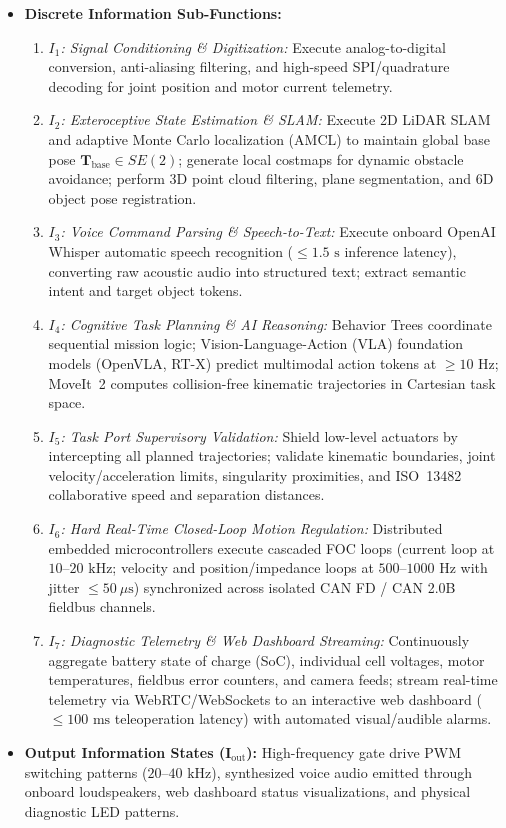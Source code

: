 \begin{itemize}[leftmargin=1.5em]
  \item \textbf{Discrete Information Sub-Functions:}
  \begin{enumerate}[leftmargin=1.2em]
    \item \emph{$I_1$: Signal Conditioning \& Digitization:} Execute analog-to-digital conversion, anti-aliasing filtering, and high-speed SPI/quadrature decoding for joint position and motor current telemetry.
    \item \emph{$I_2$: Exteroceptive State Estimation \& SLAM:} Execute 2D LiDAR SLAM and adaptive Monte Carlo localization (AMCL) to maintain global base pose $\mathbf{T}_{\text{base}} \in SE(2)$; generate local costmaps for dynamic obstacle avoidance; perform 3D point cloud filtering, plane segmentation, and 6D object pose registration.
    \item \emph{$I_3$: Voice Command Parsing \& Speech-to-Text:} Execute onboard OpenAI Whisper automatic speech recognition ($\le 1.5\text{ s}$ inference latency), converting raw acoustic audio into structured text; extract semantic intent and target object tokens.
    \item \emph{$I_4$: Cognitive Task Planning \& AI Reasoning:} Behavior Trees coordinate sequential mission logic; Vision-Language-Action (VLA) foundation models (OpenVLA, RT-X) predict multimodal action tokens at $\ge 10\text{ Hz}$; MoveIt~2 computes collision-free kinematic trajectories in Cartesian task space.
    \item \emph{$I_5$: Task Port Supervisory Validation:} Shield low-level actuators by intercepting all planned trajectories; validate kinematic boundaries, joint velocity/acceleration limits, singularity proximities, and ISO~13482 collaborative speed and separation distances.
    \item \emph{$I_6$: Hard Real-Time Closed-Loop Motion Regulation:} Distributed embedded microcontrollers execute cascaded FOC loops (current loop at $10\text{--}20\text{ kHz}$; velocity and position/impedance loops at $500\text{--}1000\text{ Hz}$ with jitter $\le 50\ \mu\text{s}$) synchronized across isolated CAN FD / CAN 2.0B fieldbus channels.
    \item \emph{$I_7$: Diagnostic Telemetry \& Web Dashboard Streaming:} Continuously aggregate battery state of charge (SoC), individual cell voltages, motor temperatures, fieldbus error counters, and camera feeds; stream real-time telemetry via WebRTC/WebSockets to an interactive web dashboard ($\le 100\text{ ms}$ teleoperation latency) with automated visual/audible alarms.
  \end{enumerate}

  \item \textbf{Output Information States ($\mathbf{I}_{\text{out}}$):}
  High-frequency gate drive PWM switching patterns ($20\text{--}40\text{ kHz}$), synthesized voice audio emitted through onboard loudspeakers, web dashboard status visualizations, and physical diagnostic LED patterns.
\end{itemize}

